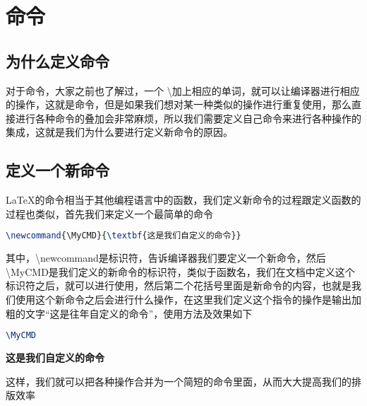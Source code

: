 \newcommand{\MyCMD}{\textbf{这是我们自定义的命令}}

\chapter{命令}
\section{为什么定义命令}
对于命令，大家之前也了解过，一个  \textbackslash 加上相应的单词，就可以让编译器进行相应的操作，这就是命令，但是如果我们想对某一种类似的操作进行重复使用，那么直接进行各种命令的叠加会非常麻烦，所以我们需要定义自己命令来进行各种操作的集成，这就是我们为什么要进行定义新命令的原因。
\section{定义一个新命令}
\LaTeX{}的命令相当于其他编程语言中的函数，我们定义新命令的过程跟定义函数的过程也类似，首先我们来定义一个最简单的命令
\begin{lstlisting}[language=TeX]
\newcommand{\MyCMD}{\textbf{这是我们自定义的命令}}
\end{lstlisting}

其中，\textbackslash newcommand是标识符，告诉编译器我们要定义一个新命令，然后\textbackslash MyCMD是我们定义的新命令的标识符，类似于函数名，我们在文档中定义这个标识符之后，就可以进行使用，然后第二个花括号里面是新命令的内容，也就是我们使用这个新命令之后会进行什么操作，在这里我们定义这个指令的操作是输出加粗的文字“这是往年自定义的命令”，使用方法及效果如下
\begin{lstlisting}[language=TeX]
\MyCMD
\end{lstlisting}

\MyCMD

这样，我们就可以把各种操作合并为一个简短的命令里面，从而大大提高我们的排版效率